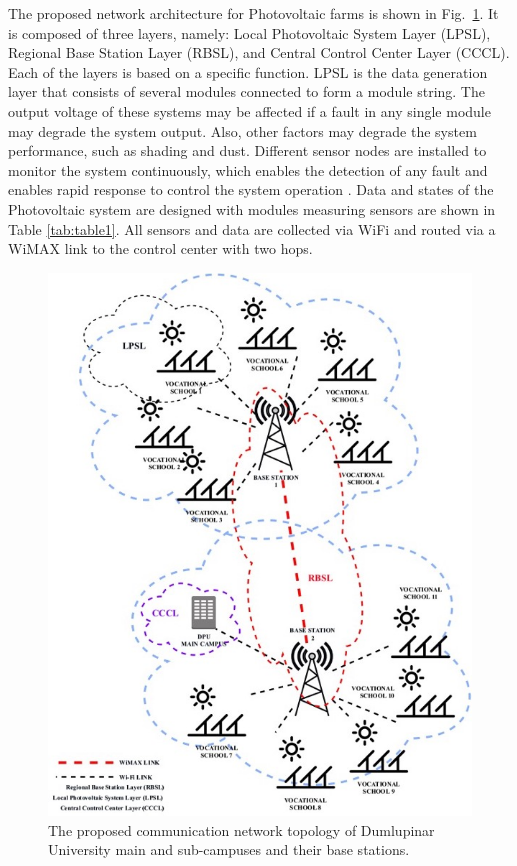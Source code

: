 \documentclass[conference, letterpaper]{IEEEtran}
\begin{document}
The proposed network architecture for Photovoltaic farms is shown in Fig.~\ref{fig:figure1}. It is composed of three layers, namely: Local Photovoltaic System Layer (LPSL), Regional Base Station Layer (RBSL), and Central Control Center Layer (CCCL). Each of the layers is based on a specific function. LPSL is the data generation layer that consists of several modules connected to form a module string. The output voltage of these systems may be affected if a fault in any single module may degrade the system output. Also, other factors may degrade the system performance, such as shading and dust. Different sensor nodes are installed to monitor the system continuously, which enables the detection of any fault and enables rapid response to control the system operation \cite{b6}. Data and states of the Photovoltaic system are designed with modules measuring sensors are shown in Table \ref{tab:table1}. All sensors and data are collected via WiFi and routed via a WiMAX link to the control center with two hops.
\begin{figure}[htbp]
\centerline{\includegraphics[width=\columnwidth]{figure1.jpg}}
\caption{The proposed communication network topology of Dumlupinar University main and sub-campuses and their base stations.}
\label{fig:figure1}
\end{figure}
\end{document}
